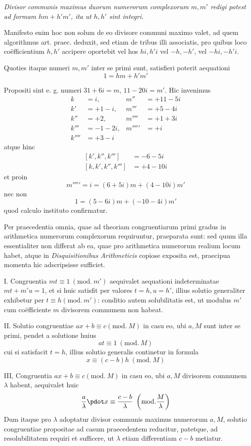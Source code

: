 \emph{Divisor communis maximus duorum numerorum complexorum $m,m'$ redigi potest ad formam $hm+h'm'$, ita ut $h,h'$ sint integri.}

Manifesto enim hoc non solum de eo divisore communi maximo valet, ad quem algorithmus art. praec. deduxit, sed etiam de tribus illi associatis, pro quibus loco coëfficientium $h,h'$ accipere oportebit vel hos $hi,h'i$ vel $-h,-h'$, vel $-hi,-h'i$.

Quoties itaque numeri $m,m'$ inter se primi sunt, satisfieri poterit aequationi
\[
1=hm+h'm'
\]

Propositi sint e. g. numeri $31+6i=m$, $11-20i=m'$. Hic invenimus
\[
\begin{aligned}
k&=i,&m''&=+11-5i\\
k'&=+1-i,&m'''&=+5-4i\\
k''&=+2,&m''''&=+1+3i\\
k'''&=-1-2i,&m'''''&=+i\\
k''''&=+3-i
\end{aligned}
\]
atque hinc
\[
\begin{aligned}
[k',k'',k''']&=-6-5i\\
[k,k',k'',k''']&=+4-10i
\end{aligned}
\]
et proin
\[
m'''''=i=(6+5i)m+(4-10i)m'
\]
nec non
\[
1=(5-6i)m+(-10-4i)m'
\]
quod calculo instituto confirmatur.

Per praecedentia omnia, quae ad theoriam congruentiarum primi gradus in arithmetica numerorum complexorum requiruntur, praeparata sunt: sed quum illa
%
essentialiter non differat ab ea, quae pro arithmetica numerorum realium locum habet, atque in \emph{Disquisitionibus Arithmeticis} copiose exposita est, praecipua momenta hic adscripsisse sufficiet.

I. Congruentia $mt\equiv1\ (\mathrm{mod.}\ m')$ aequivalet aequationi indeterminatae $mt+m'u=1$, et si huic satisfit per valores $t=h,u=h'$, illius solutio generaliter exhibetur per $t\equiv h(\mathrm{mod.}\ m')$: conditio autem solubilitatis est, ut modulus $m'$ cum coëfficiente $m$ divisorem communem non habeat.

II. Solutio congruentiae $ax+b\equiv c(\mathrm{mod.}\ M)$ in casu eo, ubi $a,M$ sunt inter se primi, pendet a solutione huius
\[
at\equiv1\ (\mathrm{mod.}\ M)
\]
cui si satisfacit $t=h$, illius solutio generalis continetur in formula
\[
x\equiv(c-b)h\ (\mathrm{mod.}\ M)
\]

III, Congruentia $ax+b\equiv c(\mathrm{mod.}\ M)$ in casu eo, ubi $a,M$ divisorem communem $\lambda$ habent, aequivalet huic
\[
\frac a\lambda\pdot x\equiv\frac{c-b}\lambda\ \left(\mathrm{mod.}\frac M\lambda\right)
\]
Dum itaque pro $\lambda$ adoptatur divisor communis maximus numerorum $a,M$, solutio congruentiae propositae ad casum praecedentem reducitur, patetque, ad resolubilitatem requiri et sufficere, ut $\lambda$ etiam differentiam $c-b$ metiatur.

